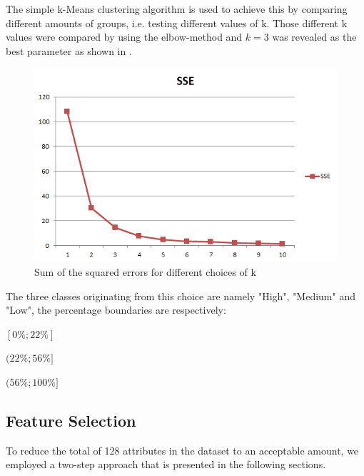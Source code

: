 The simple k-Means clustering algorithm is used to achieve this
by comparing different amounts of groups, i.e. testing
different values of k. Those different k values were compared by using
the elbow-method and \(k=3\) was revealed as the best parameter as
shown in .
\begin{figure}[H]
  \centering
  \includegraphics[width=\columnwidth]{../../charts/SSE.png}
  \caption{Sum of the squared errors for different choices of k}
  \label{fig:sse}
\end{figure}
\noindent The three classes originating from this choice are namely
"High", "Medium" and "Low", the percentage boundaries are
respectively:
\begin{description}
  \setlength{\itemsep}{-2pt}
\item[Low:] \([0\%; 22\%]\) 
\item[Medium:] \((22\%; 56\%]\)
\item[High:] \((56\%; 100\%]\)
\end{description}

\subsection{Feature Selection}
\label{sec:feature_selection}    

To reduce the total of 128 attributes in the dataset to an acceptable
amount, we employed a two-step approach that is presented in the
following sections.

